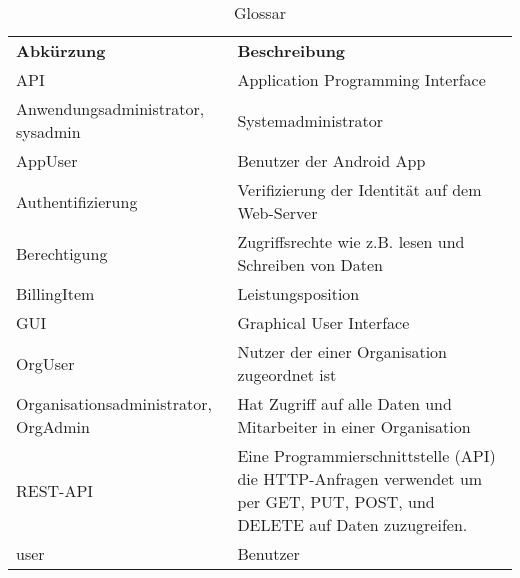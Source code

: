 
\begin{table}[h]
	\centering
	\begin{tabularx}{\textwidth}{X X}
		\rowcolor[HTML]{C0C0C0} 
		\textbf{Abkürzung} & \textbf{Beschreibung} \\
		API & Application Programming Interface\\

		\rowcolor[HTML]{E7E7E7} 
		Anwendungsadministrator, sysadmin & Systemadministrator \\

		AppUser & Benutzer der Android App \\
		\rowcolor[HTML]{E7E7E7} 		
		Authentifizierung & Verifizierung der Identität auf dem Web-Server \\
		

		Berechtigung & Zugriffsrechte wie z.B. lesen und Schreiben von Daten \\
				\rowcolor[HTML]{E7E7E7} 
		BillingItem & Leistungsposition \\
		GUI & Graphical User Interface \\

		\rowcolor[HTML]{E7E7E7} 

		OrgUser & Nutzer der einer Organisation zugeordnet ist \\


		Organisationsadministrator, OrgAdmin & Hat Zugriff auf alle Daten und Mitarbeiter in einer Organisation \\
		\rowcolor[HTML]{E7E7E7} 		
		REST-API & Eine Programmierschnittstelle (API) die HTTP-Anfragen verwendet um per GET, PUT, POST, und DELETE auf Daten zuzugreifen.\\

		user & Benutzer \\
	\end{tabularx}
	\caption{Glossar}
	\label{table:glossar}
\end{table}